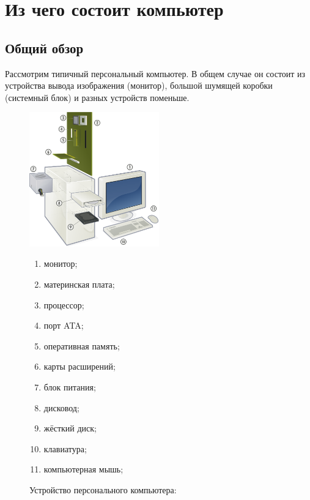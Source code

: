 \section{Из чего состоит компьютер}\label{base:introduction:components}
\subsection{Общий обзор}\label{base:introduction:components:review}
Рассмотрим типичный персональный компьютер. В общем случае он состоит из устройства вывода изображения (монитор), большой шумящей коробки (системный блок) и разных устройств поменьше.
\begin{figure}[h!]
 \centering
 \includegraphics[width=0.5\textwidth]{base/Introduction/Computer.png}
 \label{base:introduction:components:review:computerpic}
 \caption{Устройство персонального компьютера:}
 \footnotesize
 \begin{enumerate}
  \item монитор;
  \item материнская плата;
  \item процессор;
  \item порт ATA;
  \item оперативная память;
  \item карты расширений;
  \item блок питания;
  \item дисковод;
  \item жёсткий диск;
  \item клавиатура;
  \item компьютерная мышь;
 \end{enumerate}
\end{figure}

